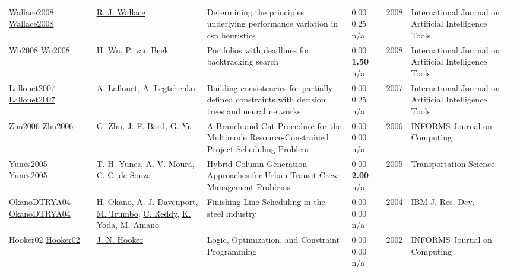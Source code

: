 {\begin{longtable}{p{3cm}p{5cm}p{10cm}p{1cm}rp{2.5cm}l}
Wallace2008 \href{http://dx.doi.org/10.1142/s0218213008004199}{Wallace2008} & \hyperref[auth:a1267]{R. J. Wallace} & Determining the principles underlying performance variation in csp heuristics & \noindent{}\textcolor{black!50}{0.00} 0.25 n/a & 2008 & International Journal on Artificial Intelligence Tools & \cite{Wallace2008}\\
Wu2008 \href{http://dx.doi.org/10.1142/s0218213008004187}{Wu2008} & \hyperref[auth:a2057]{H. Wu}, \hyperref[auth:a609]{P. van Beek} & Portfolios with deadlines for backtracking search & \noindent{}\textcolor{black!50}{0.00} \textbf{1.50} n/a & 2008 & International Journal on Artificial Intelligence Tools & \cite{Wu2008}\\
Lallouet2007 \href{http://dx.doi.org/10.1142/s0218213007003503}{Lallouet2007} & \hyperref[auth:a427]{A. Lallouet}, \hyperref[auth:a1932]{A. Legtchenko} & Building consistencies for partially defined constraints with decision trees and neural networks & \noindent{}\textcolor{black!50}{0.00} 0.25 n/a & 2007 & International Journal on Artificial Intelligence Tools & \cite{Lallouet2007}\\
Zhu2006 \href{http://dx.doi.org/10.1287/ijoc.1040.0121}{Zhu2006} & \hyperref[auth:a1526]{G. Zhu}, \hyperref[auth:a1527]{J. F. Bard}, \hyperref[auth:a1528]{G. Yu} & A Branch-and-Cut Procedure for the Multimode Resource-Constrained Project-Scheduling Problem & \noindent{}\textcolor{black!50}{0.00} \textcolor{black!50}{0.00} n/a & 2006 & \cellcolor{red!20}INFORMS Journal on Computing & \cite{Zhu2006}\\
Yunes2005 \href{http://dx.doi.org/10.1287/trsc.1030.0078}{Yunes2005} & \hyperref[auth:a941]{T. H. Yunes}, \hyperref[auth:a1578]{A. V. Moura}, \hyperref[auth:a170]{C. C. de Souza} & Hybrid Column Generation Approaches for Urban Transit Crew Management Problems & \noindent{}\textcolor{black!50}{0.00} \textbf{2.00} n/a & 2005 & \cellcolor{red!20}Transportation Science & \cite{Yunes2005}\\
OkanoDTRYA04 \href{https://doi.org/10.1147/rd.485.0811}{OkanoDTRYA04} & \hyperref[auth:a1287]{H. Okano}, \hyperref[auth:a248]{A. J. Davenport}, \hyperref[auth:a1288]{M. Trumbo}, \hyperref[auth:a250]{C. Reddy}, \hyperref[auth:a1289]{K. Yoda}, \hyperref[auth:a1290]{M. Amano} & Finishing Line Scheduling in the steel industry & \noindent{}\textcolor{black!50}{0.00} \textcolor{black!50}{0.00} n/a & 2004 & {IBM} J. Res. Dev. & \cite{OkanoDTRYA04}\\
Hooker02 \href{http://dx.doi.org/10.1287/ijoc.14.4.295.2828}{Hooker02} & \hyperref[auth:a160]{J. N. Hooker} & Logic, Optimization, and Constraint Programming & \noindent{}\textcolor{black!50}{0.00} \textcolor{black!50}{0.00} n/a & 2002 & \cellcolor{red!20}INFORMS Journal on Computing & \cite{Hooker02}\\

\end{longtable}}
